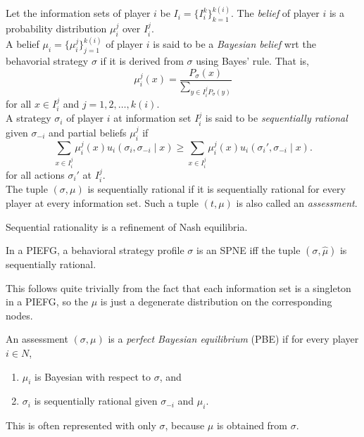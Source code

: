
		\begin{fdef}
			Let the information sets of player $i$ be $I_i = \{ I_i^k \}_{k=1}^{k(i)}$. The \emph{belief} of player $i$ is a probability distribution $\mu_i^j$ over $I_i^j$.\\
			A belief $\mu_i = \{\mu_i^j\}_{j=1}^{k(i)}$ of player $i$ is said to be a \emph{Bayesian belief} wrt the behavorial strategy $\sigma$ if it is derived from $\sigma$ using Bayes' rule. That is,
			\[ \mu_i^j(x) = \frac{P_\sigma(x)}{\sum_{y \in I_i^j P_\sigma(y)}} \]
			for all $x \in I_i^j$ and $j = 1,2,\ldots,k(i)$.\\
			A strategy $\sigma_i$ of player $i$ at information set $I_i^j$ is said to be \emph{sequentially rational} given $\sigma_{-i}$ and partial beliefs $\mu_i^j$ if
			\[ \sum_{x \in I_i^j} \mu_i^j(x) u_i(\sigma_i,\sigma_{-i} \mid x) \ge \sum_{x \in I_i^j} \mu_i^j(x) u_i(\sigma_i',\sigma_{-i} \mid x). \]
			for all actions $\sigma_i'$ at $I_i^j$.\\
			The tuple $(\sigma,\mu)$ is sequentially rational if it is sequentially rational for every player at every information set. Such a tuple $(t,\mu)$ is also called an \emph{assessment}.
		\end{fdef}

		Sequential rationality is a refinement of Nash equilibria.

		\begin{fprop}
			In a PIEFG, a behavioral strategy profile $\sigma$ is an SPNE iff the tuple $(\sigma,\hat{\mu})$ is sequentially rational.
		\end{fprop}
		This follows quite trivially from the fact that each information set is a singleton in a PIEFG, so the $\mu$ is just a degenerate distribution on the corresponding nodes.

		\begin{fdef}
			An assessment $(\sigma,\mu)$ is a \emph{perfect Bayesian equilibrium} (PBE) if for every player $i \in N$,
			\begin{enumerate}
				\item $\mu_i$ is Bayesian with respect to $\sigma$, and
				\item $\sigma_i$ is sequentially rational given $\sigma_{-i}$ and $\mu_i$.
			\end{enumerate}
		\end{fdef}
		This is often represented with only $\sigma$, because $\mu$ is obtained from $\sigma$.

